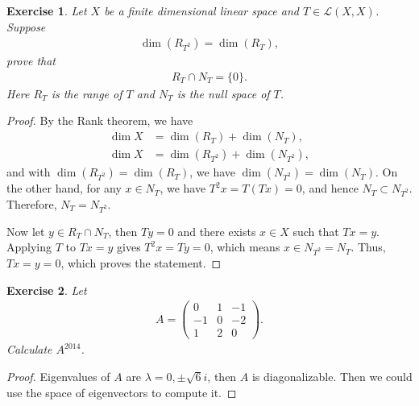 \documentclass[11pt]{article}
\newtheorem{exercise}{Exercise}[section]
\theoremstyle{definition}
\numberwithin{equation}{subsection}
\begin{document}
\begin{exercise}
Let $X$ be a finite dimensional linear space and $T \in \mathscr{L}(X, X)$. Suppose 
\begin{align*}
    \dim \left(R_{T^2}\right) = \dim \left(R_{T}\right),
\end{align*}
prove that 
\begin{align*}
    R_T \cap N_T = \{0\}.
\end{align*}
Here $R_T$ is the range of $T$ and $N_T$ is the null space of $T$.
\end{exercise}
\begin{proof}
By the Rank theorem, we have 
\begin{align*}
    \dim X & = \dim \left(R_{T}\right) + \dim \left(N_{T}\right), \\
    \dim X & = \dim \left(R_{T^2}\right) + \dim \left(N_{T^2}\right),
\end{align*}
and with $\dim \left(R_{T^2}\right) = \dim \left(R_{T}\right)$, we have $\dim \left(N_{T^2}\right) = \dim \left(N_{T}\right)$. On the other hand, for any $x \in N_T$, we have $T^2x = T(Tx) = 0$, and hence $N_T \subset N_{T^2}$. Therefore, $N_T = N_{T^2}$.

Now let $y \in R_T \cap N_T$, then $Ty = 0$ and there exists $x \in X$ such that $Tx= y$. Applying $T$ to $Tx= y$ gives $T^2x = Ty = 0$, which means $x \in N_{T^2} = N_T$. Thus, $Tx = y = 0$, which proves the statement.
\end{proof}

\medskip

\begin{exercise}
Let
\begin{align*}
    A = \begin{pmatrix}
        0 & 1 & -1 \\
        -1 & 0 & -2 \\
        1 & 2 & 0
    \end{pmatrix}.
\end{align*}
Calculate $A^{2014}$.
\end{exercise}
\begin{proof}
Eigenvalues of $A$ are $\lambda = 0, \pm \sqrt{6}i$, then $A$ is diagonalizable. Then we could use the space of eigenvectors to compute it.
\end{proof}

\medskip
\end{document}
